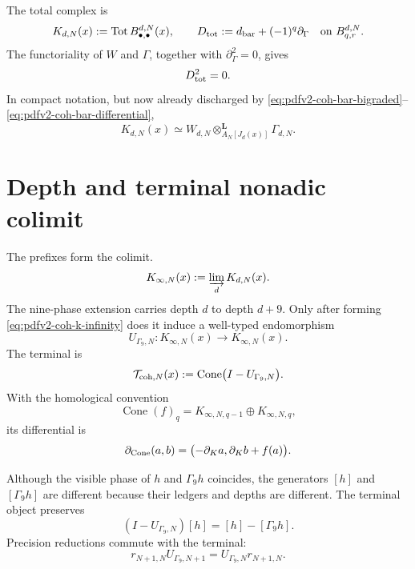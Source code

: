 The total complex is
\begin{equation}\label{eq:pdfv2-coh-total-complex}
 K_{d,N}(x):=\operatorname{Tot}B_{\bullet,\bullet}^{d,N}(x),
 \qquad
 D_{\rm tot}:=d_{\rm bar}+(-1)^q\partial_\Gamma
 \quad\text{on }B_{q,r}^{d,N}.
\end{equation}
The functoriality of \(W\) and \(\Gamma\), together with
\(\partial_\Gamma^2=0\), gives
\begin{equation}\label{eq:pdfv2-coh-total-square-zero}
 D_{\rm tot}^2=0.
\end{equation}
In compact notation, but now already discharged by
\eqref{eq:pdfv2-coh-bar-bigraded}--
\eqref{eq:pdfv2-coh-bar-differential},
\begin{equation}\label{eq:pdfv2-coh-derived-coend}
 K_{d,N}(x)
 \simeq
 W_{d,N}\otimes^{\mathbf L}_{A_N[J_d(x)]}\Gamma_{d,N}.
\end{equation}

\section{Depth and terminal nonadic colimit}
\label{sec:pdfv2-coh-terminal}

The prefixes form the colimit.
\begin{equation}\label{eq:pdfv2-coh-k-infinity}
 K_{\infty,N}(x):=\varinjlim_d K_{d,N}(x).
\end{equation}
The nine-phase extension carries depth \(d\) to depth \(d+9\).
Only after forming \eqref{eq:pdfv2-coh-k-infinity} does it induce a
well-typed endomorphism
\begin{equation}\label{eq:pdfv2-coh-u-gamma9}
 U_{\Gamma_9,N}:K_{\infty,N}(x)
 \longrightarrow K_{\infty,N}(x).
\end{equation}
The terminal is
\begin{equation}\label{eq:pdfv2-coh-terminal-cone}
 \mathcal T_{{\rm coh},N}(x)
 :=\operatorname{Cone}\bigl(I-U_{\Gamma_9,N}\bigr).
\end{equation}
With the homological convention
\[
 \operatorname{Cone}(f)_q
 =K_{\infty,N,q-1}\oplus K_{\infty,N,q},
\]
its differential is
\begin{equation}\label{eq:pdfv2-coh-cone-differential}
 \partial_{\rm Cone}(a,b)
 =\bigl(-\partial_Ka,\partial_Kb+f(a)\bigr).
\end{equation}

Although the visible phase of \(h\) and \(\Gamma_9h\) coincides, the generators
\([h]\) and \([\Gamma_9h]\) are different because their ledgers and depths
are different. The terminal object preserves
\begin{equation}\label{eq:pdfv2-coh-terminal-difference}
 (I-U_{\Gamma_9,N})[h]=[h]-[\Gamma_9h].
\end{equation}
Precision reductions commute with the terminal:
\begin{equation}\label{eq:pdfv2-coh-u-reduction}
 r_{N+1,N}U_{\Gamma_9,N+1}
 =U_{\Gamma_9,N}r_{N+1,N}.
\end{equation}

